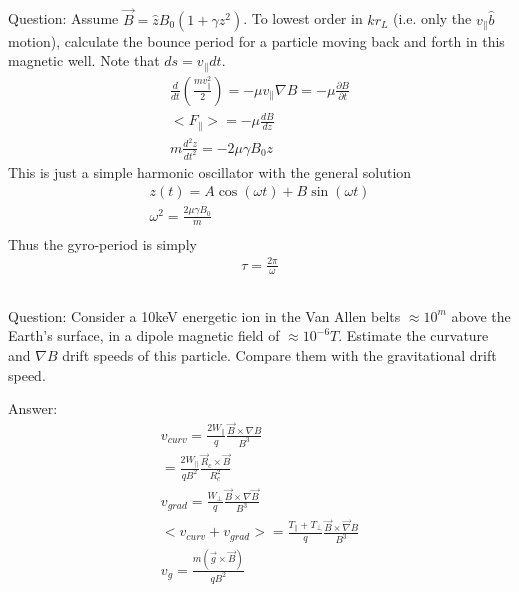 \documentclass{article}
\newcommand{\partialt}[1]{\frac{\partial #1}{\partial t}}
\begin{document}
\subsection{}
Question: Assume $\vec{B}=\hat{z}B_0(1+\gamma z^2)$. To lowest order in $kr_L$ (i.e. only the $v_\parallel \hat{b}$ motion), calculate the bounce period for a particle moving back and forth in this magnetic well. Note that $ds=v_\parallel dt$.
\begin{eqnarray*}
    \frac{d}{dt}(\frac{mv_\parallel^2}{2})=-\mu v_\parallel \nabla B=-\mu \partialt{B}\\
    <F_\parallel>=-\mu\frac{dB}{dz}\\
    m\frac{d^2z}{dt^2}=-2\mu \gamma B_0z
\end{eqnarray*}
This is just a simple harmonic oscillator with the general solution
\begin{eqnarray*}
    z(t)=A\cos(\omega t)+B \sin(\omega t)\\
    \omega^2=\frac{2\mu \gamma B_0}{m}\\
\end{eqnarray*}
Thus the gyro-period is simply
\begin{eqnarray*}
    \tau=\frac{2\pi}{\omega}
\end{eqnarray*}

\subsection{}
Question: Consider a 10keV energetic ion in the Van Allen belts $\approx 10^m$ above the Earth's surface, in a dipole magnetic field of $\approx 10^{-6} T$.
Estimate the curvature and $\nabla B$ drift speeds of this particle.
Compare them with the gravitational drift speed.

Answer:
\begin{eqnarray*}
    v_{curv}=\frac{2W_\parallel}{q}\frac{\vec{B}\times \nabla B}{B^3}\\
    =\frac{2W_\parallel}{qB^2}\frac{\vec{R}_c \times \vec{B}}{R_c^2}\\
    v_{grad}=\frac{W_\perp}{q}\frac{\vec{B}\times \nabla \vec{B}}{B^3}\\
    <v_{curv}+v_{grad}> =\frac{T_\parallel+T_\perp}{q}\frac{\vec{B}\times \vec{\nabla}B}{B^3}\\
    v_{g}=\frac{m(\vec{g}\times\vec{B})}{qB^2}\\
\end{eqnarray*}
\end{document}
